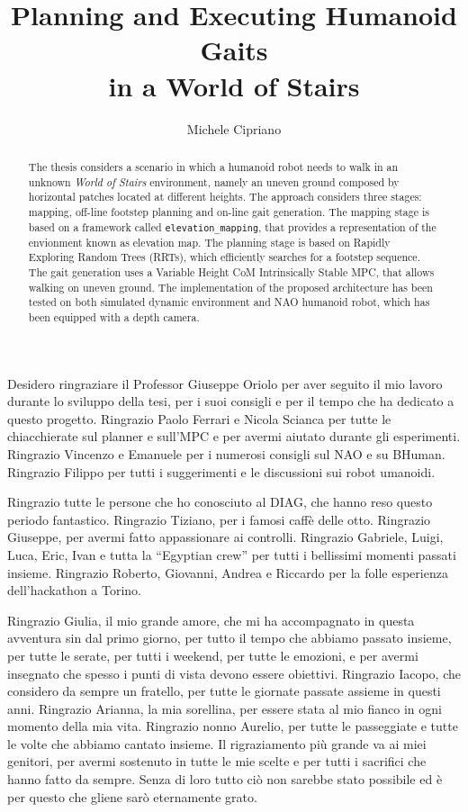 \documentclass[LaM,binding=0.6cm]{sapthesis}
\title{Planning and Executing Humanoid Gaits \\in a World of Stairs}
\author{Michele Cipriano}
\begin{document}
\frontmatter

\maketitle

\dedication{A mamma e pap\`a.}

\begin{acknowledgments}
Desidero ringraziare il Professor Giuseppe Oriolo per aver seguito il mio 
lavoro durante lo sviluppo della tesi, per i suoi consigli e per il tempo 
che ha dedicato a questo progetto. Ringrazio Paolo Ferrari e Nicola Scianca per 
tutte le chiacchierate sul planner e sull'MPC e per avermi aiutato durante
gli esperimenti. Ringrazio Vincenzo e Emanuele per i numerosi consigli sul NAO
e su BHuman. Ringrazio Filippo per tutti i suggerimenti e le discussioni 
sui robot umanoidi.

Ringrazio tutte le persone che ho conosciuto al DIAG, che hanno reso questo
periodo fantastico. Ringrazio Tiziano, per i famosi caff\`e delle otto. Ringrazio
Giuseppe, per avermi fatto appassionare ai controlli. Ringrazio Gabriele,
Luigi, Luca, Eric, Ivan e tutta la ``Egyptian crew'' per tutti i bellissimi
momenti passati insieme.
Ringrazio Roberto, Giovanni, Andrea
e Riccardo per la folle esperienza dell'hackathon a Torino.

Ringrazio Giulia, il mio grande amore, che mi ha accompagnato in questa
avventura sin dal
primo giorno, per tutto il tempo che abbiamo passato insieme, per tutte le 
serate, per tutti i weekend,
per tutte le emozioni, e
per avermi insegnato che spesso i punti di vista devono essere obiettivi.
Ringrazio Iacopo, che considero da sempre un fratello, per tutte 
le giornate passate assieme in questi anni. Ringrazio Arianna, la mia sorellina,
per essere stata al mio fianco in ogni momento della mia vita. Ringrazio nonno
Aurelio, per tutte le passeggiate e tutte le volte che abbiamo cantato insieme.
Il rigraziamento pi\`u grande va ai miei genitori, per avermi sostenuto in tutte
le mie scelte e per tutti i sacrifici che hanno fatto da sempre. Senza di loro
tutto ci\`o non sarebbe stato possibile ed \`e per questo che gliene sar\`o
eternamente grato.
\end{acknowledgments}

\begin{abstract}
The thesis considers a scenario in which a humanoid robot needs to walk
in an unknown \textit{World of Stairs} environment, namely an uneven ground
composed by horizontal patches located at different heights. The approach
considers three stages: mapping, off-line footstep planning and on-line
gait generation. The mapping stage is based on a framework called
\texttt{elevation\_mapping}, that provides a representation of the 
envionment known as elevation map. The planning stage is based on Rapidly
Exploring Random Trees (RRTs), which efficiently searches for a footstep
sequence. The gait generation uses a Variable Height CoM Intrinsically Stable
MPC, that allows walking on uneven ground. The implementation of the
proposed architecture has been tested on both simulated dynamic environment
and NAO humanoid robot, which has been equipped with a depth camera.
\end{abstract}
\end{document}

